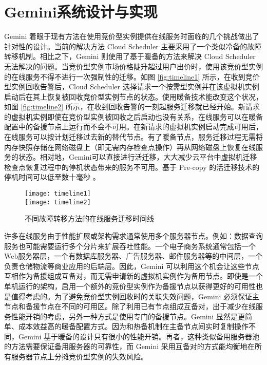 \section{Gemini系统设计与实现}
\label{sec-gemini}
Gemini 着眼于现有方法在使用竞价型实例提供在线服务时面临的几个挑战做出了针对性的设计。当前的解决方法 Cloud Scheduler \cite{He:2015:CCH:2749246.2749275} 主要采用了一个类似冷备的故障转移机制。相比之下，Gemini 则使用了基于暖备的方法来解决 Cloud Scheduler 无法解决的问题。当竞价型实例市场价格陡升超过用户出价时，使用该竞价型实例的在线服务不得不进行一次强制性的迁移。如图 \ref{fig:timeline1} 所示，在收到竞价型实例回收告警后，Cloud Scheduler 选择请求一个按需型实例并在该虚拟机实例启动后在其上恢复被回收竞价型实例节点的状态。使用暖备技术能改变这个状况，如图 \ref{fig:timeline2} 所示，在收到回收告警的一刻起服务迁移就已经开始。新请求的虚拟机实例即使在竞价型实例被回收之后启动也没有关系，在线服务可以在暖备配置中的备援节点上运行而不会不可用。在新请求的虚拟机实例启动完成可用后，在线服务可以按计划迁移过去新的替代节点。有了暖备节点，服务迁移过程无需将内存快照存储在网络磁盘上（即无需内存检查点操作）再从网络磁盘上恢复在线服务的状态。相对地，Gemini可以直接进行活迁移，大大减少云平台中虚拟机迁移检查点恢复过程中的停机状态带来的服务不可用。基于 Pre-copy 的活迁移技术的停机时间可以低至数十毫秒 \cite{Clark:2005:LMV:1251203.1251223}。
\begin{figure}
  \centering%
    {\texttt{[image: timeline1]}}%
  \\
  \vspace{5em}%
      {\texttt{[image: timeline2]}}
  \vspace{5em}%
  \caption{不同故障转移方法的在线服务迁移时间线}
  \label{fig:timeline}
\end{figure}

许多在线服务由于性能扩展或架构需求通常使用多个服务器节点。例如：数据查询服务也可能需要运行多个分片来扩展吞吐性能。一个电子商务系统通常包括一个Web服务器层，一个有数据库服务器、广告服务器、邮件服务器等的中间层，一个负责仓储物流等商业应用的后端层。因此，Gemini 可以利用这个机会让这些节点互相作为备援组成互备对，而无需申请新的虚拟机实例作为备用节点。即使是一个单机运行的架构，启用一个额外的竞价型实例作为备援节点以获得更好的可用性也是值得考虑的。为了避免竞价型实例回收时的关联失效问题，Gemini 必须保证主节点和备援节点在不同的可用区。除了利用已有节点组成互备对，出于减少在线服务性能开销的考虑，另外一种方式是使用专门的备援节点。Gemini 显然是更简单、成本效益高的暖备配置方式。因为和热备机制在主备节点间实时复制操作不同，Gemini 基于暖备的设计只有很小的性能开销。再者，这种类似备用服务器池的方法需要保证备用服务器的可靠性，而 Gemini 采用互备对的方式能均衡地在所有服务器节点上分摊竞价型实例的失效风险。

